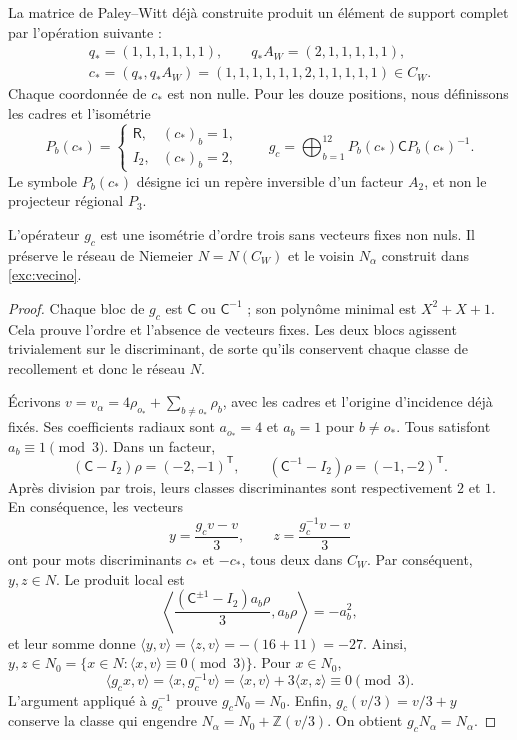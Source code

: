 La matrice de Paley--Witt déjà construite produit un élément de support
complet par l'opération suivante :
\begin{equation}
 \begin{gathered}
 q_*=(1,1,1,1,1,1),\qquad q_*A_W=(2,1,1,1,1,1),\\
 c_*=(q_*,q_*A_W)
 =(1,1,1,1,1,1,2,1,1,1,1,1)\in C_W.
 \end{gathered}
 \label{km:palabra-total}
\end{equation}
Chaque coordonnée de \(c_*\) est non nulle. Pour les douze positions,
nous définissons les cadres et l'isométrie
\begin{equation}
 P_b(c_*)=
 \begin{cases}\mathsf R,&(c_*)_b=1,\\I_2,&(c_*)_b=2,\end{cases}
 \qquad
 g_c=\bigoplus_{b=1}^{12}P_b(c_*)\mathsf C P_b(c_*)^{-1}.
 \label{km:isometria-ternaria}
\end{equation}
Le symbole \(P_b(c_*)\) désigne ici un repère inversible d’un facteur
\(A_2\), et non le projecteur régional \(P_3\).

\begin{proposition}
\label{km:estabilidad-vecino}
L'opérateur \(g_c\) est une isométrie d'ordre trois sans vecteurs fixes non nuls. Il préserve le réseau de Niemeier \(N=N(C_W)\) et le voisin \(N_\alpha\) construit dans \eqref{exc:vecino}.
\end{proposition}
\begin{proof}
Chaque bloc de \(g_c\) est \(\mathsf C\) ou \(\mathsf C^{-1}\) ;
son polynôme minimal est \(X^2+X+1\). Cela prouve l'ordre et
l'absence de vecteurs fixes. Les deux blocs agissent trivialement sur le
discriminant, de sorte qu'ils conservent chaque classe de recollement et donc
le réseau \(N\).

Écrivons \(v=v_\alpha=4\rho_{o_*}+\sum_{b\ne o_*}\rho_b\),
avec les cadres et l'origine d'incidence déjà fixés. Ses coefficients
radiaux sont \(a_{o_*}=4\) et \(a_b=1\) pour \(b\ne o_*\).
Tous satisfont \(a_b\equiv1\pmod3\). Dans un facteur,
\[
 (\mathsf C-I_2)\rho=(-2,-1)^{\mathsf T},\qquad
 (\mathsf C^{-1}-I_2)\rho=(-1,-2)^{\mathsf T}.
\]
Après division par trois, leurs classes discriminantes sont respectivement \(2\) et \(1\). En conséquence, les vecteurs
\begin{equation}
 y=\frac{g_cv-v}{3},\qquad z=\frac{g_c^{-1}v-v}{3}
 \label{km:desplazamientos}
\end{equation}
ont pour mots discriminants \(c_*\) et \(-c_*\), tous deux dans
\(C_W\). Par conséquent, \(y,z\in N\). Le produit local est
\[
 \left\langle
 \frac{(\mathsf C^{\pm1}-I_2)a_b\rho}{3},a_b\rho
 \right\rangle=-a_b^2,
\]
et leur somme donne \(\langle y,v\rangle=\langle z,v\rangle=-(16+11)=-27\). Ainsi, \(y,z\in N_0=\{x\in N:\langle x,v\rangle\equiv0\pmod3\}\). Pour \(x\in N_0\),
\[
 \langle g_cx,v\rangle
 =\langle x,g_c^{-1}v\rangle
 =\langle x,v\rangle+3\langle x,z\rangle\equiv0\pmod3.
\]
L'argument appliqué à \(g_c^{-1}\) prouve \(g_cN_0=N_0\).
Enfin, \(g_c(v/3)=v/3+y\) conserve la classe qui engendre
\(N_\alpha=N_0+\mathbb Z(v/3)\). On obtient
\(g_cN_\alpha=N_\alpha\).
\end{proof}

